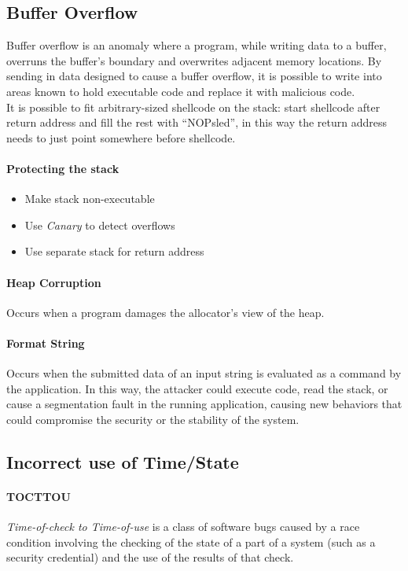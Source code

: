 \subsection{Buffer Overflow}
Buffer overflow is an anomaly where a program, while writing data to a buffer, overruns the buffer's boundary and overwrites adjacent memory locations. By sending in data designed to cause a buffer overflow, it is possible to write into areas known to hold executable code and replace it with malicious code.\\
It is possible to fit arbitrary-sized shellcode on the stack: start shellcode after return address and fill the rest with “NOPsled”, in this way the return address needs to just point somewhere before shellcode.

\paragraph{Protecting the stack}
\begin{itemize}
    \item Make stack non-executable
    \item Use \textit{Canary} to detect overflows
    \item Use separate stack for return address
\end{itemize}
\paragraph{Heap Corruption} Occurs when a program damages the allocator's view of the heap.
\paragraph{Format String} Occurs when the submitted data of an input string is evaluated as a command by the application. In this way, the attacker could execute code, read the stack, or cause a segmentation fault in the running application, causing new behaviors that could compromise the security or the stability of the system.

\subsection{Incorrect use of Time/State}
\paragraph{TOCTTOU} \textit{Time-of-check to Time-of-use} is a class of software bugs caused by a race condition involving the checking of the state of a part of a system (such as a security credential) and the use of the results of that check.

